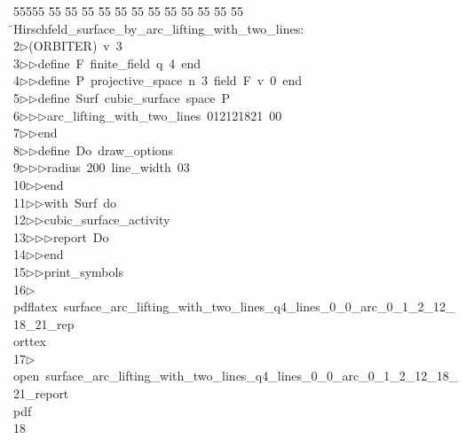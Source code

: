 %
%
\begin{tabbing}
55555 \= 55 \= 55 \= 55 \= 55 \= 55 \= 55 \= 55 \= 55 \= 55 \= 55 \= 55 \= 55 \= \>Hirschfeld\_surface\_by\_arc\_lifting\_with\_two\_lines:\\[0pt]
2\>$\triangleright$\>(ORBITER)\ v\ 3\ \\[0pt]
3\>$\triangleright$\>$\triangleright$\>define\ F\ finite\_field\ q\ 4\ end\ \\[0pt]
4\>$\triangleright$\>$\triangleright$\>define\ P\ projective\_space\ n\ 3\ field\ F\ v\ 0\ end\ \\[0pt]
5\>$\triangleright$\>$\triangleright$\>define\ Surf\ cubic\_surface\ space\ P\ \\[0pt]
6\>$\triangleright$\>$\triangleright$\>$\triangleright$\>arc\_lifting\_with\_two\_lines\ 012121821\ 00\ \\[0pt]
7\>$\triangleright$\>$\triangleright$\>end\ \\[0pt]
8\>$\triangleright$\>$\triangleright$\>define\ Do\ draw\_options\ \\[0pt]
9\>$\triangleright$\>$\triangleright$\>$\triangleright$\>radius\ 200\ line\_width\ 03\ \\[0pt]
10\>$\triangleright$\>$\triangleright$\>end\ \\[0pt]
11\>$\triangleright$\>$\triangleright$\>with\ Surf\ do\ \\[0pt]
12\>$\triangleright$\>$\triangleright$\>cubic\_surface\_activity\ \\[0pt]
13\>$\triangleright$\>$\triangleright$\>$\triangleright$\>report\ Do\ \\[0pt]
14\>$\triangleright$\>$\triangleright$\>end\ \\[0pt]
15\>$\triangleright$\>$\triangleright$\>print\_symbols\\[0pt]
16\>$\triangleright$\>pdflatex\ surface\_arc\_lifting\_with\_two\_lines\_q4\_lines\_0\_0\_arc\_0\_1\_2\_12\_18\_21\_rep\\[0pt]
\>orttex\\[0pt]
17\>$\triangleright$\>open\ surface\_arc\_lifting\_with\_two\_lines\_q4\_lines\_0\_0\_arc\_0\_1\_2\_12\_18\_21\_report\\[0pt]
\>pdf\\[0pt]
18\>\end{tabbing}
